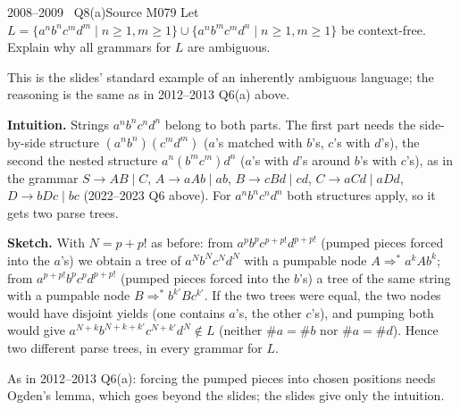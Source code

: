 \documentclass[11pt,a4paper]{article}
\begin{document}
\begin{question}{2008--2009 \textbullet\ Q8(a)}{Source M07}{9}
Let $L=\{a^nb^nc^md^m\mid n\ge1,m\ge1\}\cup\{a^nb^mc^md^n\mid n\ge1,m\ge1\}$ be context-free. Explain why all grammars for $L$ are ambiguous.
\end{question}
\begin{solution}
This is the slides' standard example of an inherently ambiguous language; the reasoning is the same as in 2012--2013 Q6(a) above.

\textbf{Intuition.} Strings $a^nb^nc^nd^n$ belong to both parts. The first part needs the side-by-side structure $(a^nb^n)(c^md^m)$ ($a$'s matched with $b$'s, $c$'s with $d$'s), the second the nested structure $a^n(b^mc^m)d^n$ ($a$'s with $d$'s around $b$'s with $c$'s), as in the grammar $S\to AB\mid C$, $A\to aAb\mid ab$, $B\to cBd\mid cd$, $C\to aCd\mid aDd$, $D\to bDc\mid bc$ (2022--2023 Q6 above). For $a^nb^nc^nd^n$ both structures apply, so it gets two parse trees.

\textbf{Sketch.} With $N=p+p!$ as before: from $a^pb^pc^{p+p!}d^{p+p!}$ (pumped pieces forced into the $a$'s) we obtain a tree of $a^Nb^Nc^Nd^N$ with a pumpable node $A\Rightarrow^*a^kAb^k$; from $a^{p+p!}b^pc^pd^{p+p!}$ (pumped pieces forced into the $b$'s) a tree of the same string with a pumpable node $B\Rightarrow^*b^{k'}Bc^{k'}$. If the two trees were equal, the two nodes would have disjoint yields (one contains $a$'s, the other $c$'s), and pumping both would give $a^{N+k}b^{N+k+k'}c^{N+k'}d^N\notin L$ (neither $\#a=\#b$ nor $\#a=\#d$). Hence two different parse trees, in every grammar for $L$.

\begin{note}As in 2012--2013 Q6(a): forcing the pumped pieces into chosen positions needs Ogden's lemma, which goes beyond the slides; the slides give only the intuition.\end{note}
\end{solution}
\end{document}
